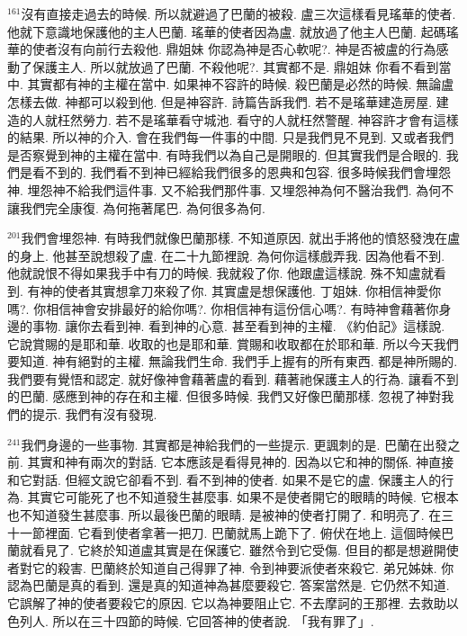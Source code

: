 \documentclass{book}
\begin{document}
$^{161}$沒有直接走過去的時候.
所以就避過了巴蘭的被殺.
盧三次這樣看見瑤華的使者.
他就下意識地保護他的主人巴蘭.
瑤華的使者因為盧.
就放過了他主人巴蘭.
起碼瑤華的使者沒有向前行去殺他.
鼎姐妹 你認為神是否心軟呢?.
神是否被盧的行為感動了保護主人.
所以就放過了巴蘭.
不殺他呢?.
其實都不是.
鼎姐妹 你看不看到當中.
其實都有神的主權在當中.
如果神不容許的時候.
殺巴蘭是必然的時候.
無論盧怎樣去做.
神都可以殺到他.
但是神容許.
詩篇告訴我們.
若不是瑤華建造房屋.
建造的人就枉然勞力.
若不是瑤華看守城池.
看守的人就枉然警醒.
神容許才會有這樣的結果.
所以神的介入.
會在我們每一件事的中間.
只是我們見不見到.
又或者我們是否察覺到神的主權在當中.
有時我們以為自己是開眼的.
但其實我們是合眼的.
我們是看不到的.
我們看不到神已經給我們很多的恩典和包容.
很多時候我們會埋怨神.
埋怨神不給我們這件事.
又不給我們那件事.
又埋怨神為何不醫治我們.
為何不讓我們完全康復.
為何拖著尾巴.
為何很多為何.

$^{201}$我們會埋怨神.
有時我們就像巴蘭那樣.
不知道原因.
就出手將他的憤怒發洩在盧的身上.
他甚至說想殺了盧.
在二十九節裡說.
為何你這樣戲弄我.
因為他看不到.
他就說恨不得如果我手中有刀的時候.
我就殺了你.
他跟盧這樣說.
殊不知盧就看到.
有神的使者其實想拿刀來殺了你.
其實盧是想保護他.
丁姐妹.
你相信神愛你嗎?.
你相信神會安排最好的給你嗎?.
你相信神有這份信心嗎?.
有時神會藉著你身邊的事物.
讓你去看到神.
看到神的心意.
甚至看到神的主權.
《約伯記》這樣說.
它說賞賜的是耶和華.
收取的也是耶和華.
賞賜和收取都在於耶和華.
所以今天我們要知道.
神有絕對的主權.
無論我們生命.
我們手上握有的所有東西.
都是神所賜的.
我們要有覺悟和認定.
就好像神會藉著盧的看到.
藉著祂保護主人的行為.
讓看不到的巴蘭.
感應到神的存在和主權.
但很多時候.
我們又好像巴蘭那樣.
忽視了神對我們的提示.
我們有沒有發現.

$^{241}$我們身邊的一些事物.
其實都是神給我們的一些提示.
更諷刺的是.
巴蘭在出發之前.
其實和神有兩次的對話.
它本應該是看得見神的.
因為以它和神的關係.
神直接和它對話.
但經文說它卻看不到.
看不到神的使者.
如果不是它的盧.
保護主人的行為.
其實它可能死了也不知道發生甚麼事.
如果不是使者開它的眼睛的時候.
它根本也不知道發生甚麼事.
所以最後巴蘭的眼睛.
是被神的使者打開了.
和明亮了.
在三十一節裡面.
它看到使者拿著一把刀.
巴蘭就馬上跪下了.
俯伏在地上.
這個時候巴蘭就看見了.
它終於知道盧其實是在保護它.
雖然令到它受傷.
但目的都是想避開使者對它的殺害.
巴蘭終於知道自己得罪了神.
令到神要派使者來殺它.
弟兄姊妹.
你認為巴蘭是真的看到.
還是真的知道神為甚麼要殺它.
答案當然是.
它仍然不知道.
它誤解了神的使者要殺它的原因.
它以為神要阻止它.
不去摩訶的王那裡.
去救助以色列人.
所以在三十四節的時候.
它回答神的使者說.
「我有罪了」.
\end{document}
